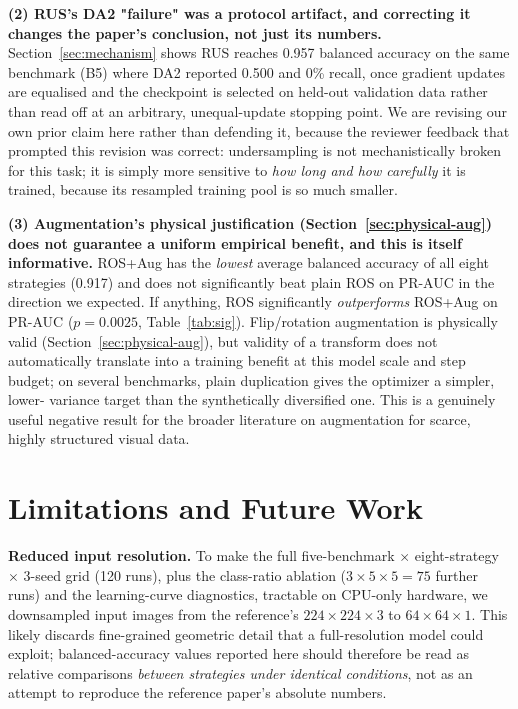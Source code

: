 \documentclass[conference]{IEEEtran}
\begin{document}
\textbf{(2) RUS's DA2 "failure" was a protocol artifact, and correcting
it changes the paper's conclusion, not just its numbers.} Section~\ref{sec:mechanism}
shows RUS reaches 0.957 balanced accuracy on the same benchmark (B5)
where DA2 reported 0.500 and 0\% recall, once gradient updates are
equalised and the checkpoint is selected on held-out validation data
rather than read off at an arbitrary, unequal-update stopping point.
We are revising our own prior claim here rather than defending it,
because the reviewer feedback that prompted this revision was correct:
undersampling is not mechanistically broken for this task; it is
simply more sensitive to \emph{how long and how carefully} it is
trained, because its resampled training pool is so much smaller.

\textbf{(3) Augmentation's physical justification
(Section~\ref{sec:physical-aug}) does not guarantee a uniform
empirical benefit, and this is itself informative.} ROS+Aug has the
\emph{lowest} average balanced accuracy of all eight strategies
(0.917) and does not significantly beat plain ROS on PR-AUC in the
direction we expected. If anything, ROS significantly
\emph{outperforms} ROS+Aug on PR-AUC ($p=0.0025$, Table~\ref{tab:sig}).
Flip/rotation augmentation is physically valid (Section~\ref{sec:physical-aug}),
but validity of a transform does not automatically translate into a
training benefit at this model scale and step budget; on several
benchmarks, plain duplication gives the optimizer a simpler, lower-
variance target than the synthetically diversified one. This is a
genuinely useful negative result for the broader literature on
augmentation for scarce, highly structured visual data.

\section{Limitations and Future Work}
\label{sec:limitations}
\textbf{Reduced input resolution.} To make the full five-benchmark
$\times$ eight-strategy $\times$ 3-seed grid (120 runs), plus the
class-ratio ablation ($3 \times 5 \times 5 = 75$ further runs) and the
learning-curve diagnostics, tractable on CPU-only hardware, we
downsampled input images from the reference's $224{\times}224{\times}3$
to $64{\times}64{\times}1$. This likely
discards fine-grained geometric detail that a full-resolution model
could exploit; balanced-accuracy values reported here should therefore
be read as relative comparisons \emph{between strategies under
identical conditions}, not as an attempt to reproduce the reference
paper's absolute numbers.
\end{document}
